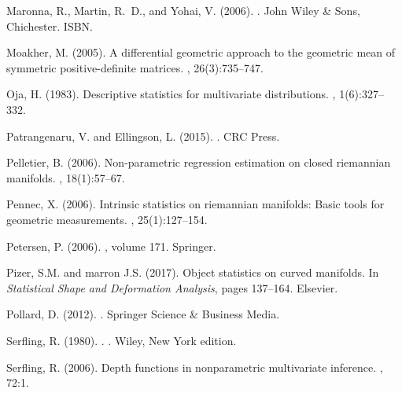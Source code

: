 \documentclass[a4paper]{article}
\numberwithin{equation}{section}
\begin{document}
\begin{thebibliography}{99}
Maronna, R., Martin, R.~D., and Yohai, V. (2006).
.
\newblock John Wiley \& Sons, Chichester. ISBN.

Moakher, M. (2005).
\newblock A differential geometric approach to the geometric mean of symmetric
  positive-definite matrices.
,
  26(3):735--747.

Oja, H. (1983).
\newblock Descriptive statistics for multivariate distributions.
, 1(6):327--332.

Patrangenaru, V. and Ellingson, L. (2015).
.
\newblock CRC Press.

Pelletier, B. (2006).
\newblock Non-parametric regression estimation on closed riemannian manifolds.
, 18(1):57--67. 

Pennec, X. (2006).
\newblock Intrinsic statistics on riemannian manifolds: Basic tools for
  geometric measurements.
, 25(1):127--154.

Petersen, P. (2006).
, volume 171.
\newblock Springer.


Pizer, S.M.  and marron J.S. (2017).
\newblock Object statistics on curved manifolds.
\newblock In {\em Statistical Shape and Deformation Analysis}, pages 137--164.
  Elsevier.




Pollard, D. (2012).
.
\newblock Springer Science \& Business Media.





Serfling, R. (1980).
.
. Wiley, New York edition.


Serfling, R. (2006).
\newblock Depth functions in nonparametric multivariate inference.
, 72:1.
  

\end{thebibliography}
\end{document}
